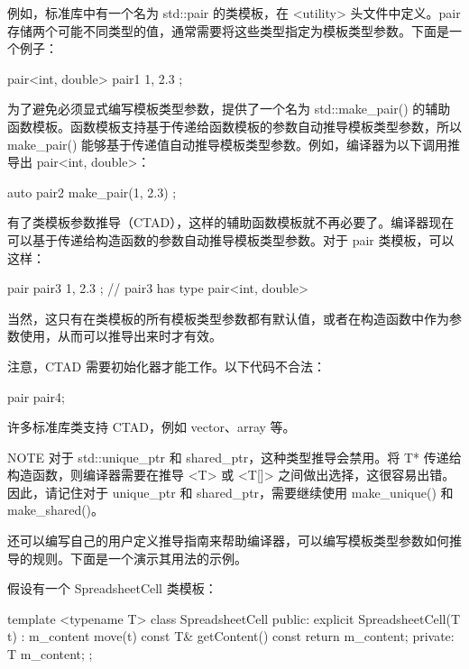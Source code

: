 例如，标准库中有一个名为 std::pair 的类模板，在 <utility> 头文件中定义。pair 存储两个可能不同类型的值，通常需要将这些类型指定为模板类型参数。下面是一个例子：

\begin{cpp}
pair<int, double> pair1 { 1, 2.3 };
\end{cpp}

为了避免必须显式编写模板类型参数，提供了一个名为 std::make\_pair() 的辅助函数模板。函数模板支持基于传递给函数模板的参数自动推导模板类型参数，所以make\_pair() 能够基于传递值自动推导模板类型参数。例如，编译器为以下调用推导出 pair<int, double>：

\begin{cpp}
auto pair2 { make_pair(1, 2.3) };
\end{cpp}

有了类模板参数推导（CTAD），这样的辅助函数模板就不再必要了。编译器现在可以基于传递给构造函数的参数自动推导模板类型参数。对于 pair 类模板，可以这样：

\begin{cpp}
pair pair3 { 1, 2.3 }; // pair3 has type pair<int, double>
\end{cpp}

当然，这只有在类模板的所有模板类型参数都有默认值，或者在构造函数中作为参数使用，从而可以推导出来时才有效。

注意，CTAD 需要初始化器才能工作。以下代码不合法：

\begin{cpp}
pair pair4;
\end{cpp}

许多标准库类支持 CTAD，例如 vector、array 等。

\begin{myNotic}{NOTE}
对于 std::unique\_ptr 和 shared\_ptr，这种类型推导会禁用。将 T* 传递给构造函数，则编译器需要在推导 <T> 或 <T[]> 之间做出选择，这很容易出错。因此，请记住对于 unique\_ptr 和 shared\_ptr，需要继续使用 make\_unique() 和 make\_shared()。
\end{myNotic}


还可以编写自己的用户定义推导指南来帮助编译器，可以编写模板类型参数如何推导的规则。下面是一个演示其用法的示例。

假设有一个 SpreadsheetCell 类模板：

\begin{cpp}
template <typename T>
class SpreadsheetCell
{
    public:
        explicit SpreadsheetCell(T t) : m_content { move(t) } { }
        const T& getContent() const { return m_content; }
    private:
        T m_content;
};
\end{cpp}

